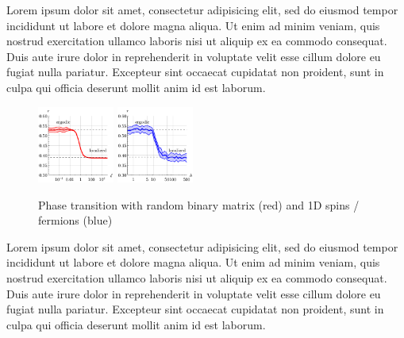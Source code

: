 Lorem ipsum dolor sit amet, consectetur adipisicing elit, sed do eiusmod
tempor incididunt ut labore et dolore magna aliqua. Ut enim ad minim veniam,
quis nostrud exercitation ullamco laboris nisi ut aliquip ex ea commodo
consequat. Duis aute irure dolor in reprehenderit in voluptate velit esse
cillum dolore eu fugiat nulla pariatur. Excepteur sint occaecat cupidatat non
proident, sunt in culpa qui officia deserunt mollit anim id est laborum.

\begin{figure}[h]
    \centering
    \includegraphics[width=0.225\textwidth]{imgs/erg_reg_add1.pdf}
    \hspace{10 mm} 
    \includegraphics[width=0.225\textwidth]{imgs/erg_reg_add2.pdf}
    \caption{Phase transition with random binary matrix (red) and 1D  spins / fermions (blue)}
\end{figure}

Lorem ipsum dolor sit amet, consectetur adipisicing elit, sed do eiusmod
tempor incididunt ut labore et dolore magna aliqua. Ut enim ad minim veniam,
quis nostrud exercitation ullamco laboris nisi ut aliquip ex ea commodo
consequat. Duis aute irure dolor in reprehenderit in voluptate velit esse
cillum dolore eu fugiat nulla pariatur. Excepteur sint occaecat cupidatat non
proident, sunt in culpa qui officia deserunt mollit anim id est laborum.


